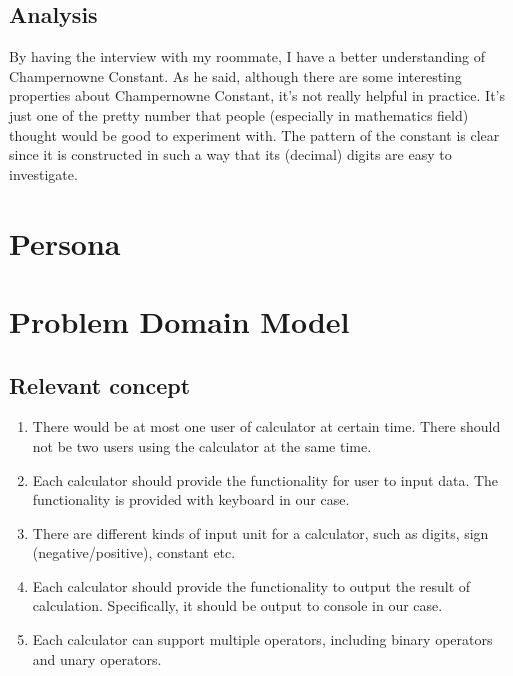 \documentclass[10pt]{article}
\begin{document}
\subsection{Analysis}
By having the interview with my roommate, I have a better understanding of Champernowne Constant. As he said, although there are some interesting properties about Champernowne Constant, it's not really helpful in practice. It's just one of the pretty number that people (especially in mathematics field) thought would be good to experiment with. The pattern of the constant is clear since it is constructed in such a way that its (decimal) digits are easy to investigate.

\section{Persona}


\section{Problem Domain Model}
\subsection{Relevant concept}
    
\begin{enumerate}
    \item There would be at most one user of calculator at certain time. There should not be two users using the calculator at the same time. 
    \item Each calculator should provide the functionality for user to input data. The functionality is provided with keyboard in our case.
    \item There are different kinds of input unit for a calculator, such as digits, sign (negative/positive), constant etc.
    \item Each calculator should provide the functionality to output the result of calculation. Specifically, it should be output to console in our case.
    \item Each calculator can support multiple operators, including binary operators and unary operators.
\end{enumerate}
\end{document}
